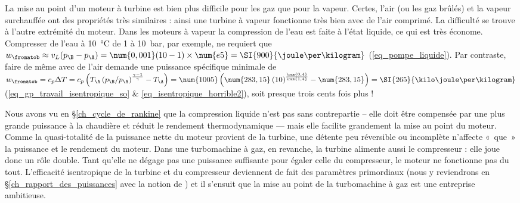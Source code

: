 La mise au point d’un moteur à turbine est bien plus difficile pour les gaz que pour la vapeur. Certes, l’air (ou les gaz brûlés) et la vapeur surchauffée ont des propriétés très similaires : ainsi une turbine à vapeur fonctionne très bien avec de l’air comprimé. La difficulté se trouve à l’autre extrémité du moteur. Dans les moteurs à vapeur la compression de l’eau est faite à l’état liquide, ce qui est très économe. Compresser de l’eau à \SI{10}{\degreeCelsius} de \num{1} à \SI{10}{\bar}, par exemple, ne requiert que $w_\fromatob \approx v_L (p_\B - p_\A ) = \num{0,001} (10 - 1) \times \num{e5} = \SI{900}{\joule\per\kilogram}$ (\ref{eq_pompe_liquide}). Par contraste, faire de même avec de l’air demande une puissance spécifique minimale de $w_\fromatob = c_p \Delta T = c_p \left( T_\A \left(p_\B/p_\A\right)^\frac{\gamma - 1}{\gamma} - T_\A \right) = \num{1005} \left(\num{283,15} \left(10\right)^\frac{\num{0,4}}{\num{1,4}} - \num{283,15} \right) = \SI{265}{\kilo\joule\per\kilogram}$ (\ref{eq_gp_travail_isentropique_so} \& \ref{eq_isentropique_horrible2}), soit presque trois cents fois plus !

Nous avons vu en \S\ref{ch_cycle_de_rankine} que la compression liquide n’est pas sans contrepartie – elle doit être compensée par une plus grande puissance à la chaudière et réduit le rendement thermodynamique — mais elle facilite grandement la mise au point du moteur. Comme la quasi-totalité de la puissance nette du moteur provient de la turbine, une détente peu réversible ou incomplète n’affecte «~que~» la puissance et le rendement du moteur. Dans une turbomachine à gaz, en revanche, la turbine alimente aussi le compresseur : elle joue donc un rôle double. Tant qu’elle ne dégage pas une puissance suffisante pour égaler celle du compresseur, le moteur ne fonctionne pas du tout. L’efficacité isentropique de la turbine et du compresseur deviennent de fait des paramètres primordiaux (nous y reviendrons en \S\ref{ch_rapport_des_puissances} avec la notion de ) et il s’ensuit que la mise au point de la turbomachine à gaz est une entreprise ambitieuse.


